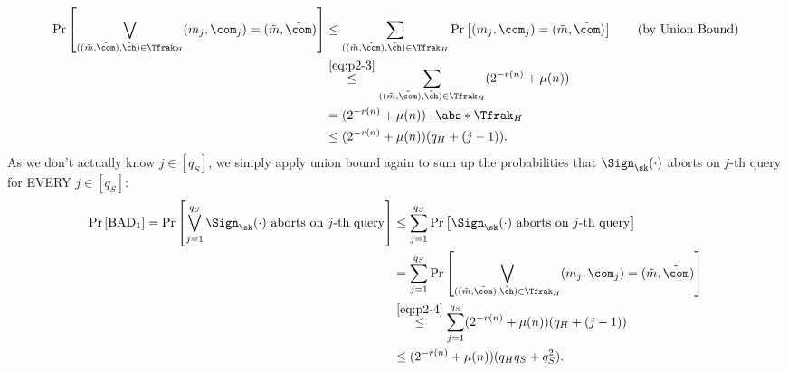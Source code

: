 \begin{answer}
    \begin{align}\label{eq:p2-4}
        \Pr\left[\bigvee_{((\tilde{m}, \tilde{\com}), \tilde{\ch}) \in \Tfrak_H} (m_j,\com_j)=(\tilde{m}, \tilde{\com}) \right]
        &\le \sum_{((\tilde{m}, \tilde{\com}), \tilde{\ch}) \in \Tfrak_H}\Pr\left[(m_j,\com_j)=(\tilde{m}, \tilde{\com}) \right]
        \qquad \textrm{(by Union Bound)}\notag\\
        &\stackrel{\eqref{eq:p2-3}}\le  \sum_{((\tilde{m}, \tilde{\com}), \tilde{\ch}) \in \Tfrak_H} (2^{-r(n)}+\mu(n)\notag)\\
        &= (2^{-r(n)}+\mu(n)) \cdot \abs*{\Tfrak_H}\notag\\
        &\le (2^{-r(n)}+\mu(n))(q_H+(j-1)).
    \end{align}
    As we don't actually know $j\in [q_S]$, we simply apply union bound again to sum up the probabilities that $\Sign_\sk(\cdot)$ aborts on $j$-th query for EVERY $j\in [q_S]$:
    \begin{align}\label{eq:p2-5}
        \Pr\left[ \textrm{BAD}_1  \right]
        = \Pr\left[\bigvee_{j=1}^{q_S}\Sign_\sk(\cdot) \textrm{ aborts on } j \textrm{-th query} \right]
        &\le \sum_{j=1}^{q_S}\Pr\left[\Sign_\sk(\cdot) \textrm{ aborts on } j \textrm{-th query} \right]\notag\\
        &= \sum_{j=1}^{q_S}\Pr\left[\bigvee_{((\tilde{m}, \tilde{\com}), \tilde{\ch}) \in \Tfrak_H} (m_j,\com_j)=(\tilde{m}, \tilde{\com}) \right]\notag\\
        &\stackrel{\eqref{eq:p2-4}}\le  \sum_{j=1}^{q_S} (2^{-r(n)}+\mu(n))(q_H+(j-1))\notag\\
        &\le (2^{-r(n)}+\mu(n))(q_Hq_S+q_S^2).
    \end{align}



\end{answer}
